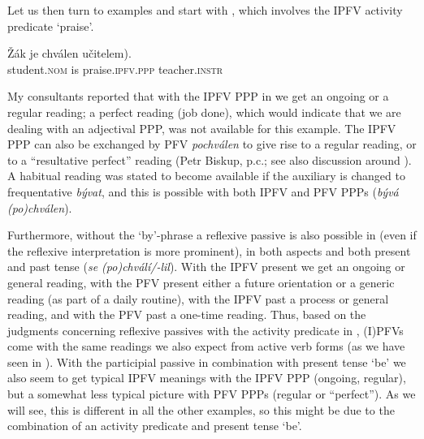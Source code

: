 \documentclass[output=paper,colorlinks,citecolor=brown]{langscibook}
\begin{document}
Let us then turn to  examples and start with , which involves the IPFV activity predicate `praise'. 

\ea\label{ex:chval}
\gll Žák je chválen \minsp{(} učitelem).\\
	student.\textsc{nom} is praise.\textsc{ipfv.ppp} {} teacher.\textsc{instr}\\
\z 

\noindent My consultants reported that with the IPFV PPP in  we get an ongoing or a regular reading; a perfect reading (job done), which would indicate that we are dealing with an adjectival PPP, was not available for this example. The IPFV PPP can also be exchanged by PFV \textit{pochválen} to give rise to a regular reading, or to a ``resultative perfect'' reading (Petr Biskup, p.c.; see also discussion around ). A habitual reading was stated to become available if the auxiliary is changed to frequentative \textit{bývat}, and this is possible with both IPFV and PFV PPPs (\textit{bývá (po)chválen}). %



Furthermore, without the `by'-phrase a reflexive passive is also possible in  (even if the reflexive interpretation is more prominent), in both aspects and both present and past tense (\textit{se (po)chválí/-lil}). With the IPFV present we get an ongoing or general reading, with the PFV present either a future orientation or a generic reading (as part of a daily routine), with the IPFV past a process or general reading, and with the PFV past a one-time reading. Thus, based on the judgments concerning reflexive passives with the activity predicate in , (I)PFVs come with the same readings we also expect from active verb forms (as we have seen in ). With the participial passive in combination with present tense `be' we also seem to get typical IPFV meanings with the IPFV PPP (ongoing, regular), but a somewhat less typical picture with PFV PPPs (regular or ``perfect''). As we will see, this is different in all the other examples, so this might be due to the combination of an activity predicate and present tense `be'. 
\end{document}

